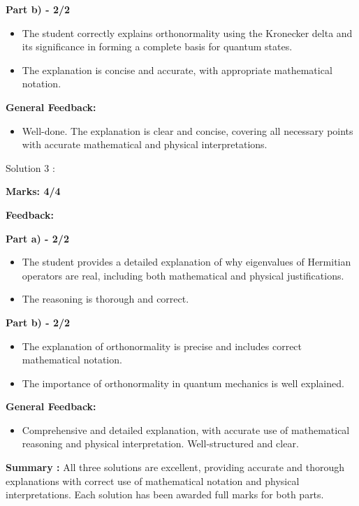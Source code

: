 \documentclass[a4paper,11pt]{article}
\begin{document}
\textbf{Part b) - 2/2}

\begin{itemize}
    \item The student correctly explains orthonormality using the Kronecker delta and its significance in forming a complete basis for quantum states.
    \item The explanation is concise and accurate, with appropriate mathematical notation.
\end{itemize}

\textbf{General Feedback:}

\begin{itemize}
    \item Well-done. The explanation is clear and concise, covering all necessary points with accurate mathematical and physical interpretations.
\end{itemize}


Solution 3 :

\textbf{Marks: 4/4}

\textbf{Feedback:}

\textbf{Part a) - 2/2}

\begin{itemize}
    \item The student provides a detailed explanation of why eigenvalues of Hermitian operators are real, including both mathematical and physical justifications.
    \item The reasoning is thorough and correct.
\end{itemize}

\textbf{Part b) - 2/2}

\begin{itemize}
    \item The explanation of orthonormality is precise and includes correct mathematical notation.
    \item The importance of orthonormality in quantum mechanics is well explained.
\end{itemize}

\textbf{General Feedback:}

\begin{itemize}
    \item Comprehensive and detailed explanation, with accurate use of mathematical reasoning and physical interpretation. Well-structured and clear.
\end{itemize}

\textbf{Summary :}
All three solutions are excellent, providing accurate and thorough explanations with correct use of mathematical notation and physical interpretations. Each solution has been awarded full marks for both parts.
\end{document}

